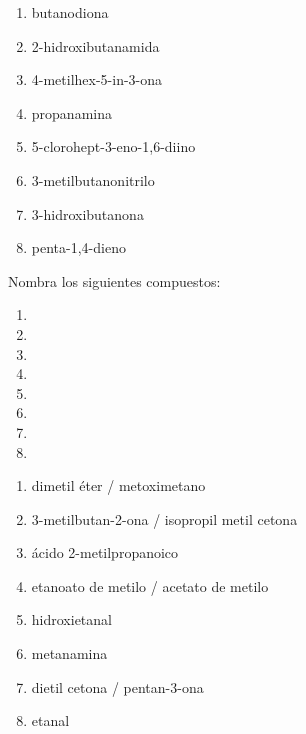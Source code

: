   \begin{solution}
    \begin{enumerate}
      \item butanodiona
      \item 2-hidroxibutanamida
      \item 4-metilhex-5-in-3-ona
      \item propanamina
      \item 5-clorohept-3-eno-1,6-diino
      \item 3-metilbutanonitrilo
      \item 3-hidroxibutanona
      \item penta-1,4-dieno
    \end{enumerate}
  \end{solution}


  \begin{exercise}[
      tags    = {orgánica,formulación,múltiple,2B},
      topics  = {química orgánica,formulación,nomenclatura},
      source  = {Química 2B SAN 2016, p391, e16},
    ]
    Nombra los siguientes compuestos:

  \begin{enumerate}
    \item {}
    \item {}
    \item {}
    \item {}
    \item {}
    \item {}
    \item {}
    \item {}
  \end{enumerate}
\end{exercise}

\begin{solution}
  \begin{enumerate}
    \item dimetil éter / metoximetano
    \item 3-metilbutan-2-ona / isopropil metil cetona
    \item ácido 2-metilpropanoico
    \item etanoato de metilo / acetato de metilo
    \item hidroxietanal
    \item metanamina
    \item dietil cetona / pentan-3-ona
    \item etanal
  \end{enumerate}
\end{solution}

